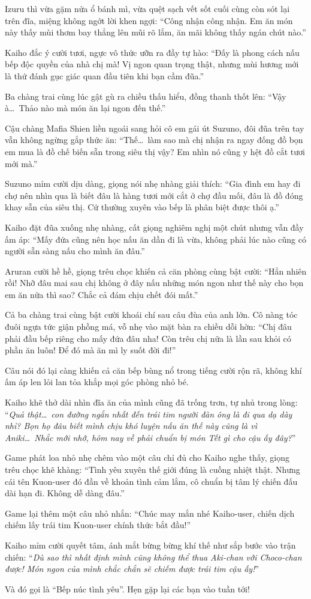 \documentclass[../main.tex]{subfiles}
\begin{document}
Izuru thì vừa gặm nửa ổ bánh mì, vừa quệt sạch vết sốt cuối cùng còn sót lại trên đĩa, miệng không ngớt lời khen ngợi: ``Công nhận công nhận. Em ăn món này thấy mùi thơm bay thẳng lên mũi rõ lắm, ăn mãi không thấy ngán chút nào.''

Kaiho đắc ý cười tươi, ngực vô thức ưỡn ra đầy tự hào: ``Đấy là phong cách nấu bếp độc quyền của nhà chị mà! Vị ngon quan trọng thật, nhưng mùi hương mới là thứ đánh gục giác quan đầu tiên khi bạn cầm đũa.''

Ba chàng trai cùng lúc gật gù ra chiều thấu hiểu, đồng thanh thốt lên: ``Vậy à\dots\ Thảo nào mà món ăn lại ngon đến thế.''

Cậu chàng Mafia Shien liền ngoái sang hỏi cô em gái út Suzuno, đôi đũa trên tay vẫn không ngừng gắp thức ăn: ``Thế\dots\ làm sao mà chị nhận ra ngay đống đồ bọn em mua là đồ chế biến sẵn trong siêu thị vậy? Em nhìn nó cũng y hệt đồ cắt tươi mới mà.''

Suzuno mỉm cười dịu dàng, giọng nói nhẹ nhàng giải thích: ``Gia đình em hay đi chợ nên nhìn qua là biết đâu là hàng tươi mới cắt ở chợ đầu mối, đâu là đồ đóng khay sẵn của siêu thị. Cứ thường xuyên vào bếp là phân biệt được thôi ạ.''

Kaiho đặt đũa xuống nhẹ nhàng, cất giọng nghiêm nghị một chút nhưng vẫn đầy ấm áp: ``Mấy đứa cũng nên học nấu ăn dần đi là vừa, không phải lúc nào cũng có người sẵn sàng nấu cho mình ăn đâu.''

Aruran cười hề hề, giọng trêu chọc khiến cả căn phòng cùng bật cười: ``Hẳn nhiên rồi! Nhỡ đâu mai sau chị không ở đây nấu những món ngon như thế này cho bọn em ăn nữa thì sao? Chắc cả đám chịu chết đói mất.''

Cả ba chàng trai cùng bật cười khoái chí sau câu đùa của anh lớn. Cô nàng tóc đuôi ngựa tức giận phồng má, vỗ nhẹ vào mặt bàn ra chiều dỗi hờn: ``Chị đâu phải đầu bếp riêng cho mấy đứa đâu nha! Còn trêu chị nữa là lần sau khỏi có phần ăn luôn! Để đó mà ăn mì ly suốt đời đi!''

Câu nói đó lại càng khiến cả căn bếp bùng nổ trong tiếng cười rộn rã, không khí ấm áp len lỏi lan tỏa khắp mọi góc phòng nhỏ bé.

Kaiho khẽ thở dài nhìn đĩa ăn của mình cũng đã trống trơn, tự nhủ trong lòng: ``\textit{Quả thật\dots\ con đường ngắn nhất đến trái tim người đàn ông là đi qua dạ dày nhỉ? Bọn họ đâu biết mình chịu khó luyện nấu ăn thế này cũng là vì Aniki\dots\ Nhắc mới nhớ, hôm nay về phải chuẩn bị món Tết gì cho cậu ấy đây?}''

Game phát loa nhỏ nhẹ chêm vào một câu chỉ đủ cho Kaiho nghe thấy, giọng trêu chọc khẽ khàng: ``Tình yêu xuyên thế giới đúng là cuồng nhiệt thật. Nhưng cái tên Kuon-user đó đần về khoản tình cảm lắm, cô chuẩn bị tâm lý chiến đấu dài hạn đi. Không dễ dàng đâu.''

Game lại thêm một câu nhỏ nhắn: ``Chúc may mắn nhé Kaiho-user, chiến dịch chiếm lấy trái tim Kuon-user chính thức bắt đầu!''

Kaiho mỉm cười quyết tâm, ánh mắt bừng bừng khí thế như sắp bước vào trận chiến: ``\textit{Dù sao thì nhất định mình cũng không thể thua Aki-chan với Choco-chan được! Món ngon của mình chắc chắn sẽ chiếm được trái tim cậu ấy!}''

Và đó gọi là ``Bếp núc tình yêu''. Hẹn gặp lại các bạn vào tuần tới!
\end{document}
